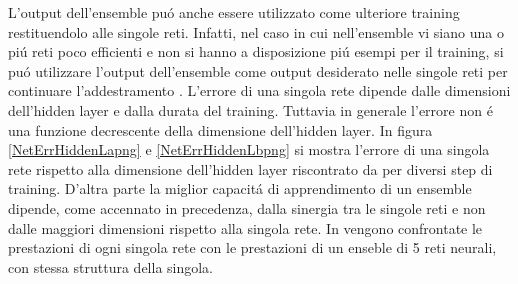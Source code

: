 \documentclass[a4paper,10pt]{article}
\begin{document}
 L'output dell'ensemble pu\'o anche essere utilizzato come ulteriore training restituendolo alle singole reti. Infatti, nel caso in cui nell'ensemble vi siano una o pi\'u reti poco efficienti e non si hanno a disposizione pi\'u esempi per il training, si pu\'o utilizzare l'output dell'ensemble come output desiderato nelle singole reti per continuare l'addestramento \cite{lincoln1990synergy}. 
 L'errore di una singola rete dipende dalle dimensioni dell'hidden layer e dalla durata del training. Tuttavia in generale l'errore non \'e una funzione decrescente della dimensione dell'hidden layer. In figura \ref{NetErrHiddenLapng} e \ref{NetErrHiddenLbpng} si mostra l'errore di una singola rete rispetto alla dimensione dell'hidden layer riscontrato da \cite{lincoln1990synergy} per diversi step di training. D'altra parte la miglior capacit\'a di apprendimento di un ensemble dipende, come accennato in precedenza, dalla sinergia tra le singole reti e non dalle maggiori dimensioni rispetto alla singola rete. In \cite{lincoln1990synergy} vengono confrontate le prestazioni di ogni singola rete con le prestazioni di un enseble di 5 reti neurali, con stessa struttura della singola.
 
\end{document}
